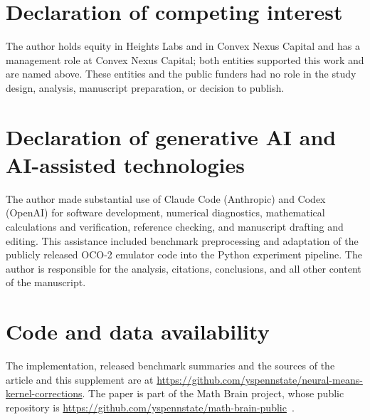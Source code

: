 \documentclass[twoside,11pt]{article}
\numberwithin{theorem}{section}
\numberwithin{equation}{section}
\numberwithin{figure}{section}
\numberwithin{table}{section}
\begin{document}
\section*{Declaration of competing interest}
The author holds equity in Heights Labs and in Convex Nexus Capital and has
a management role at Convex Nexus Capital; both entities supported this work
and are named above. These entities and the public funders had no role in
the study design, analysis, manuscript preparation, or decision to publish.

\section*{Declaration of generative AI and AI-assisted technologies}
The author made substantial use of Claude Code (Anthropic) and Codex
(OpenAI) for software development, numerical diagnostics, mathematical
calculations and verification, reference checking, and manuscript drafting
and editing.
This assistance included benchmark preprocessing and adaptation of the
publicly released OCO-2 emulator code into the Python experiment pipeline.
The author is responsible for the
analysis, citations, conclusions, and all other content of the manuscript.

\section*{Code and data availability}
The implementation, released benchmark summaries and the sources of the article and this supplement are at \url{https://github.com/yspennstate/neural-means-kernel-corrections}. The paper is part of the Math Brain project, whose public repository is \url{https://github.com/yspennstate/math-brain-public}~\citep{MathBrainRepo}.


\end{document}
